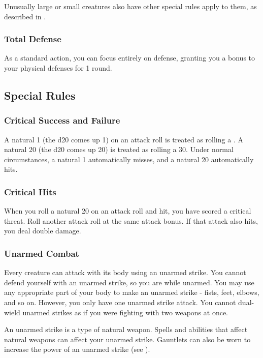 Unusually large or small creatures also have other special rules apply to them, as described in .

\subsubsection{Total Defense}\label{Total Defense}
As a standard action, you can focus entirely on defense, granting you a  bonus to your physical defenses for 1 round.

\subsection{Special Rules}\label{Special Rules}

\subsubsection{Critical Success and Failure}\label{Critical Success and Failure}
A natural 1 (the d20 comes up 1) on an attack roll is treated as rolling a . A natural 20 (the d20 comes up 20) is treated as rolling a 30. Under normal circumstances, a natural 1 automatically misses, and a natural 20 automatically hits.

\subsubsection{Critical Hits}\label{Critical Hits}
When you roll a natural 20 on an attack roll and hit, you have scored a critical threat. Roll another attack roll at the same attack bonus. If that attack also hits, you deal double damage.


\subsubsection{Unarmed Combat}\label{Unarmed Combat}
Every creature can attack with its body using an unarmed strike. You cannot defend yourself with an unarmed strike, so you are  while unarmed. You may use any appropriate part of your body to make an unarmed strike - fists, feet, elbows, and so on. However, you only have one unarmed strike attack. You cannot dual-wield unarmed strikes as if you were fighting with two weapons at once.

An unarmed strike is a type of natural weapon. Spells and abilities that affect natural weapons can affect your unarmed strike. Gauntlets can also be worn to increase the power of an unarmed strike (see ).


